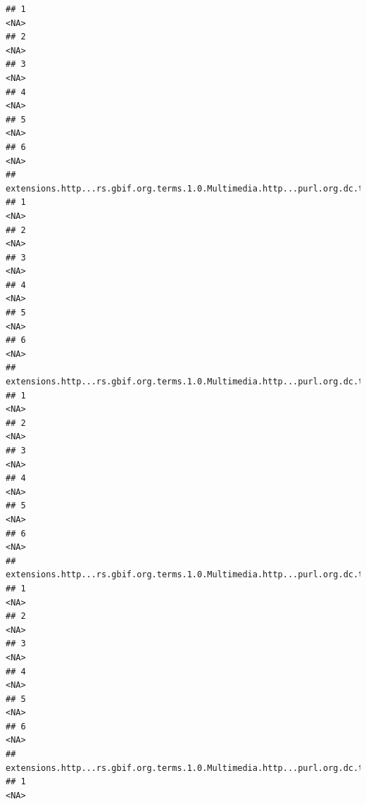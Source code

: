 \documentclass[
]{book}
\begin{document}
\begin{verbatim}
## 1                                                                                  <NA>
## 2                                                                                  <NA>
## 3                                                                                  <NA>
## 4                                                                                  <NA>
## 5                                                                                  <NA>
## 6                                                                                  <NA>
##   extensions.http...rs.gbif.org.terms.1.0.Multimedia.http...purl.org.dc.terms.created.7
## 1                                                                                  <NA>
## 2                                                                                  <NA>
## 3                                                                                  <NA>
## 4                                                                                  <NA>
## 5                                                                                  <NA>
## 6                                                                                  <NA>
##   extensions.http...rs.gbif.org.terms.1.0.Multimedia.http...purl.org.dc.terms.format.7
## 1                                                                                 <NA>
## 2                                                                                 <NA>
## 3                                                                                 <NA>
## 4                                                                                 <NA>
## 5                                                                                 <NA>
## 6                                                                                 <NA>
##   extensions.http...rs.gbif.org.terms.1.0.Multimedia.http...purl.org.dc.terms.references.7
## 1                                                                                     <NA>
## 2                                                                                     <NA>
## 3                                                                                     <NA>
## 4                                                                                     <NA>
## 5                                                                                     <NA>
## 6                                                                                     <NA>
##   extensions.http...rs.gbif.org.terms.1.0.Multimedia.http...purl.org.dc.terms.creator.7
## 1                                                                                  <NA>

\end{verbatim}
\end{document}
